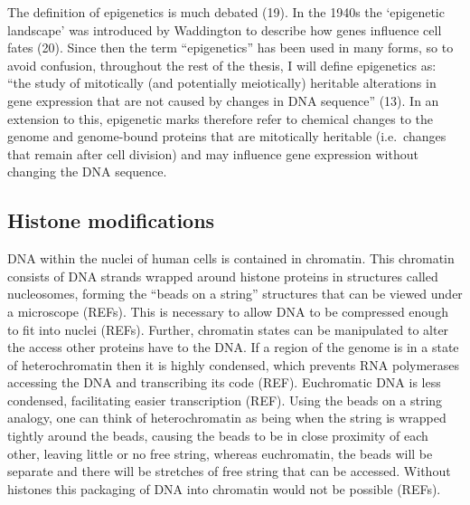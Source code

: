 \documentclass[11pt,oneside]{bristolthesis}
\begin{document}
The definition of epigenetics is much debated (19). In the 1940s the `epigenetic landscape' was introduced by Waddington to describe how genes influence cell fates (20). Since then the term ``epigenetics'' has been used in many forms, so to avoid confusion, throughout the rest of the thesis, I will define epigenetics as: ``the study of mitotically (and potentially meiotically) heritable alterations in gene expression that are not caused by changes in DNA sequence'' (13). In an extension to this, epigenetic marks therefore refer to chemical changes to the genome and genome-bound proteins that are mitotically heritable (i.e.~changes that remain after cell division) and may influence gene expression without changing the DNA sequence.

\hypertarget{histone-modifications}{%
\subsection{Histone modifications}\label{histone-modifications}}

DNA within the nuclei of human cells is contained in chromatin. This chromatin consists of DNA strands wrapped around histone proteins in structures called nucleosomes, forming the ``beads on a string'' structures that can be viewed under a microscope (REFs). This is necessary to allow DNA to be compressed enough to fit into nuclei (REFs). Further, chromatin states can be manipulated to alter the access other proteins have to the DNA. If a region of the genome is in a state of heterochromatin then it is highly condensed, which prevents RNA polymerases accessing the DNA and transcribing its code (REF). Euchromatic DNA is less condensed, facilitating easier transcription (REF). Using the beads on a string analogy, one can think of heterochromatin as being when the string is wrapped tightly around the beads, causing the beads to be in close proximity of each other, leaving little or no free string, whereas euchromatin, the beads will be separate and there will be stretches of free string that can be accessed. Without histones this packaging of DNA into chromatin would not be possible (REFs).
\end{document}
